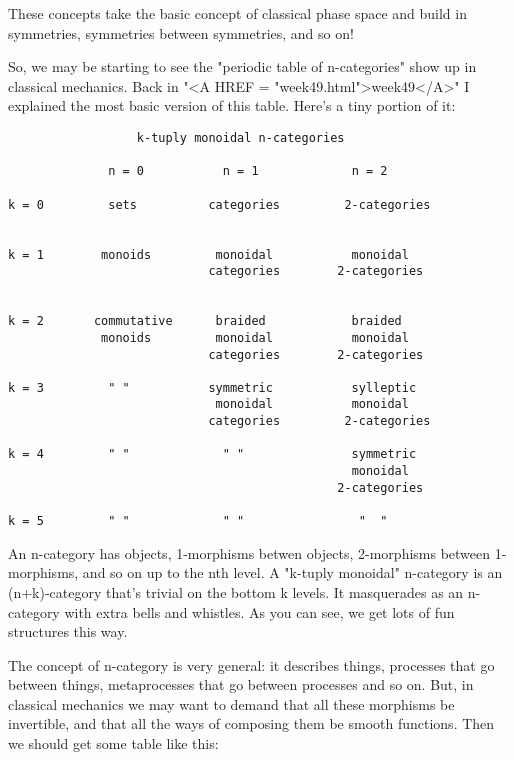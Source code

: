 These concepts take the basic concept of classical phase space and
build in symmetries, symmetries between symmetries, and so on!

So, we may be starting to see the "periodic table of n-categories"
show up in classical mechanics.
Back in "<A HREF = "week49.html">week49</A>" I explained the most basic version of this 
table.  Here's a tiny portion of it:

\begin{verbatim}
                  k-tuply monoidal n-categories 

              n = 0           n = 1             n = 2

k = 0         sets          categories         2-categories
     

k = 1        monoids         monoidal           monoidal
                            categories        2-categories


k = 2       commutative      braided            braided
             monoids         monoidal           monoidal
                            categories        2-categories 

k = 3         " "           symmetric           sylleptic
                             monoidal           monoidal
                            categories         2-categories

k = 4         " "             " "               symmetric
                                                monoidal
                                              2-categories

k = 5         " "             " "                "  "
\end{verbatim}
    

An n-category has objects, 1-morphisms betwen objects, 2-morphisms
between 1-morphisms, and so on up to the nth level.  A "k-tuply 
monoidal" n-category is an (n+k)-category that's trivial on the 
bottom k levels.  It masquerades as an n-category with extra bells
and whistles.  As you can see, we get lots of fun structures this 
way.  

The concept of n-category is very general: it describes things,
processes that go between things, metaprocesses that go between
processes and so on.   But, in classical mechanics we may want 
to demand that all these morphisms be invertible, and that all the 
ways of composing them be smooth functions.  Then we should get some 
table like this:

